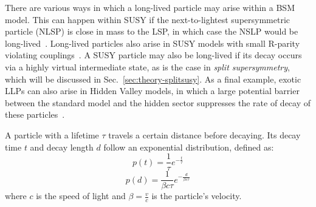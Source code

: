 There are various ways in which a long-lived particle may arise within a BSM 
model. 
This can happen within SUSY if the next-to-lightest supersymmetric particle 
(NLSP) is close in mass to the LSP, in which case the NSLP would be 
long-lived~\cite{nlsp}. 
Long-lived particles also arise in SUSY models with small R-parity violating 
couplings~\cite{rpv}. 
A SUSY particle may also be long-lived if its decay occurs via a highly virtual 
intermediate state, as is the case in \textit{split supersymmetry}, which will 
be discussed in Sec.~\ref{sec:theory-splitsusy}. 
As a final example, exotic LLPs can also arise in Hidden Valley models, in 
which a large potential barrier between the standard model and the hidden 
sector suppresses the rate of decay of these particles~\cite{hiddenvalleys}.

A particle with a lifetime $\tau$ travels a certain distance before decaying. 
Its decay time $t$ and decay length $d$ follow an exponential distribution, 
defined as:
\begin{equation}
p(t) = \frac{1}{\tau} e^{-\frac{t}{\tau}}
\end{equation}
\begin{equation}
p(d) = \frac{1}{\beta c\tau} e^{-\frac{d}{\beta c\tau}}
\end{equation}
where $c$ is the speed of light and $\beta=\frac{v}{c}$ is the particle's 
velocity.%

